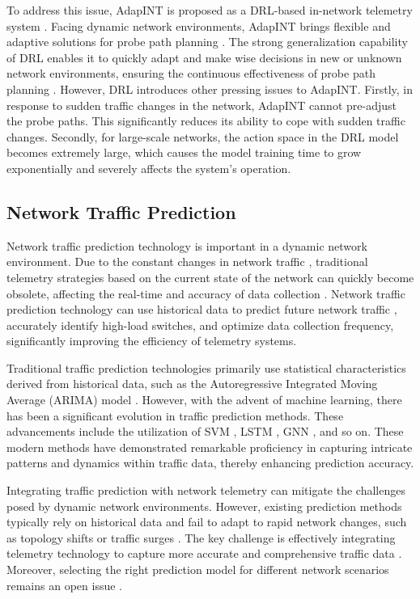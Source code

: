 To address this issue, AdapINT is proposed as a DRL-based in-network telemetry system \cite{AdapINT}. Facing dynamic network environments, AdapINT brings flexible and adaptive solutions for probe path planning \cite{20}. The strong generalization capability of DRL enables it to quickly adapt and make wise decisions in new or unknown network environments, ensuring the continuous effectiveness of probe path planning \cite{23}. However, DRL introduces other pressing issues to AdapINT. Firstly, in response to sudden traffic changes in the network, AdapINT cannot pre-adjust the probe paths. This significantly reduces its ability to cope with sudden traffic changes. Secondly, for large-scale networks, the action space in the DRL model becomes extremely large, which causes the model training time to grow exponentially and severely affects the system's operation.


\subsection{Network Traffic Prediction}


Network traffic prediction technology is important in a dynamic network environment. Due to the constant changes in network traffic \cite{16}, traditional telemetry strategies based on the current state of the network can quickly become obsolete, affecting the real-time and accuracy of data collection \cite{15}. Network traffic prediction technology can use historical data to predict future network traffic \cite{17}, accurately identify high-load switches, and optimize data collection frequency, significantly improving the efficiency of telemetry systems.


Traditional traffic prediction technologies primarily use statistical characteristics derived from historical data, such as the Autoregressive Integrated Moving Average (ARIMA) model \cite{35}. However, with the advent of machine learning, there has been a significant evolution in traffic prediction methods. These advancements include the utilization of SVM \cite{36}, LSTM \cite{37}, GNN \cite{38}, and so on. These modern methods have demonstrated remarkable proficiency in capturing intricate patterns and dynamics within traffic data, thereby enhancing prediction accuracy.


Integrating traffic prediction with network telemetry can mitigate the challenges posed by dynamic network environments. However, existing prediction methods typically rely on historical data and fail to adapt to rapid network changes, such as topology shifts or traffic surges \cite{40}. The key challenge is effectively integrating telemetry technology to capture more accurate and comprehensive traffic data \cite{39}. Moreover, selecting the right prediction model for different network scenarios remains an open issue \cite{27}.

